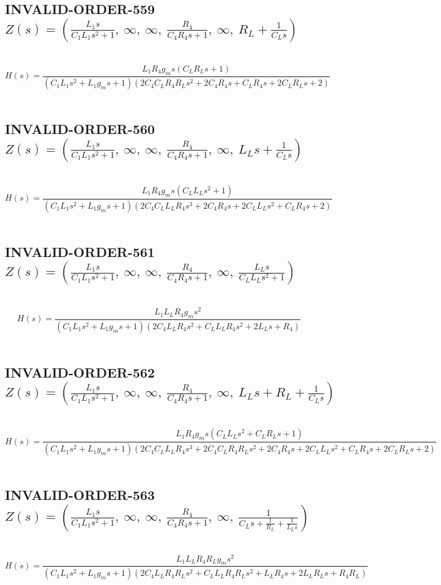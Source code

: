 \documentclass{article}
\begin{document}
\subsection{INVALID-ORDER-559 $Z(s) = \left( \frac{L_{1} s}{C_{1} L_{1} s^{2} + 1}, \  \infty, \  \infty, \  \frac{R_{4}}{C_{4} R_{4} s + 1}, \  \infty, \  R_{L} + \frac{1}{C_{L} s}\right)$ } \ 
\textbf{\[H(s) = \frac{L_{1} R_{4} g_{m} s \left(C_{L} R_{L} s + 1\right)}{\left(C_{1} L_{1} s^{2} + L_{1} g_{m} s + 1\right) \left(2 C_{4} C_{L} R_{4} R_{L} s^{2} + 2 C_{4} R_{4} s + C_{L} R_{4} s + 2 C_{L} R_{L} s + 2\right)}\] } \ 
\subsection{INVALID-ORDER-560 $Z(s) = \left( \frac{L_{1} s}{C_{1} L_{1} s^{2} + 1}, \  \infty, \  \infty, \  \frac{R_{4}}{C_{4} R_{4} s + 1}, \  \infty, \  L_{L} s + \frac{1}{C_{L} s}\right)$ } \ 
\textbf{\[H(s) = \frac{L_{1} R_{4} g_{m} s \left(C_{L} L_{L} s^{2} + 1\right)}{\left(C_{1} L_{1} s^{2} + L_{1} g_{m} s + 1\right) \left(2 C_{4} C_{L} L_{L} R_{4} s^{3} + 2 C_{4} R_{4} s + 2 C_{L} L_{L} s^{2} + C_{L} R_{4} s + 2\right)}\] } \ 
\subsection{INVALID-ORDER-561 $Z(s) = \left( \frac{L_{1} s}{C_{1} L_{1} s^{2} + 1}, \  \infty, \  \infty, \  \frac{R_{4}}{C_{4} R_{4} s + 1}, \  \infty, \  \frac{L_{L} s}{C_{L} L_{L} s^{2} + 1}\right)$ } \ 
\textbf{\[H(s) = \frac{L_{1} L_{L} R_{4} g_{m} s^{2}}{\left(C_{1} L_{1} s^{2} + L_{1} g_{m} s + 1\right) \left(2 C_{4} L_{L} R_{4} s^{2} + C_{L} L_{L} R_{4} s^{2} + 2 L_{L} s + R_{4}\right)}\] } \ 
\subsection{INVALID-ORDER-562 $Z(s) = \left( \frac{L_{1} s}{C_{1} L_{1} s^{2} + 1}, \  \infty, \  \infty, \  \frac{R_{4}}{C_{4} R_{4} s + 1}, \  \infty, \  L_{L} s + R_{L} + \frac{1}{C_{L} s}\right)$ } \ 
\textbf{\[H(s) = \frac{L_{1} R_{4} g_{m} s \left(C_{L} L_{L} s^{2} + C_{L} R_{L} s + 1\right)}{\left(C_{1} L_{1} s^{2} + L_{1} g_{m} s + 1\right) \left(2 C_{4} C_{L} L_{L} R_{4} s^{3} + 2 C_{4} C_{L} R_{4} R_{L} s^{2} + 2 C_{4} R_{4} s + 2 C_{L} L_{L} s^{2} + C_{L} R_{4} s + 2 C_{L} R_{L} s + 2\right)}\] } \ 
\subsection{INVALID-ORDER-563 $Z(s) = \left( \frac{L_{1} s}{C_{1} L_{1} s^{2} + 1}, \  \infty, \  \infty, \  \frac{R_{4}}{C_{4} R_{4} s + 1}, \  \infty, \  \frac{1}{C_{L} s + \frac{1}{R_{L}} + \frac{1}{L_{L} s}}\right)$ } \ 
\textbf{\[H(s) = \frac{L_{1} L_{L} R_{4} R_{L} g_{m} s^{2}}{\left(C_{1} L_{1} s^{2} + L_{1} g_{m} s + 1\right) \left(2 C_{4} L_{L} R_{4} R_{L} s^{2} + C_{L} L_{L} R_{4} R_{L} s^{2} + L_{L} R_{4} s + 2 L_{L} R_{L} s + R_{4} R_{L}\right)}\] } \ 
\end{document}
